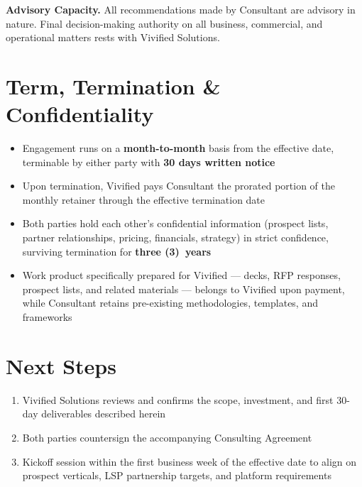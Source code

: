 \documentclass{toospoint}
\begin{document}
\begin{clausebox}
\sffamily\footnotesize\color{TPGray}
\textbf{Advisory Capacity.} All recommendations made by Consultant are advisory
in nature. Final decision-making authority on all business, commercial, and
operational matters rests with Vivified Solutions.
\end{clausebox}

\section{Term, Termination \& Confidentiality}

\begin{itemize}[leftmargin=1.5em, itemsep=4pt, topsep=4pt]
  \item Engagement runs on a \textbf{month-to-month} basis from the effective date, terminable by either party with \textbf{30 days written notice}
  \item Upon termination, Vivified pays Consultant the prorated portion of the monthly retainer through the effective termination date
  \item Both parties hold each other's confidential information (prospect lists, partner relationships, pricing, financials, strategy) in strict confidence, surviving termination for \textbf{three (3)~years}
  \item Work product specifically prepared for Vivified --- decks, RFP responses, prospect lists, and related materials --- belongs to Vivified upon payment, while Consultant retains pre-existing methodologies, templates, and frameworks
\end{itemize}

\section{Next Steps}

\begin{enumerate}[leftmargin=1.5em, itemsep=4pt, topsep=4pt]
  \item Vivified Solutions reviews and confirms the scope, investment, and first 30-day deliverables described herein
  \item Both parties countersign the accompanying Consulting Agreement
  \item Kickoff session within the first business week of the effective date to align on prospect verticals, LSP partnership targets, and platform requirements
\end{enumerate}
\end{document}
